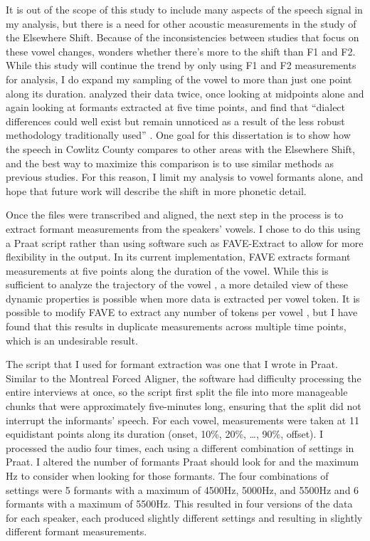 It is out of the scope of this study to include many aspects of the speech signal in my analysis, but there is a need for other acoustic measurements in the study of the Elsewhere Shift. Because of the inconsistencies between studies that focus on these vowel changes, \citet[150]{boberg_2005} wonders whether there's more to the shift than F1 and F2. While this study will continue the trend by only using F1 and F2 measurements for analysis, I do expand my sampling of the vowel to more than just one point along its duration. \citeauthor{jacewicz_etal_2006} analyzed their data twice, once looking at midpoints alone and again looking at formants extracted at five time points, and find that ``dialect differences could well exist but remain unnoticed as a result of the less robust methodology traditionally used'' \citeyearpar[300]{jacewicz_etal_2006}. One goal for this dissertation is to show how the speech in Cowlitz County compares to other areas with the Elsewhere Shift, and the best way to maximize this comparison is to use similar methods as previous studies. For this reason, I limit my analysis to vowel formants alone, and hope that future work will describe the shift in more phonetic detail.

Once the files were transcribed and aligned, the next step in the process is to extract formant measurements from the speakers’ vowels. I chose to do this using a Praat script rather than using software such as FAVE-Extract \citep{rosenfelder_etal_2014} to allow for more flexibility in the output. In its current implementation, FAVE extracts formant measurements at five points along the duration of the vowel. While this is sufficient to analyze the trajectory of the vowel \citep{renwick_stanley_2020}, a more detailed view of these dynamic properties is possible when more data is extracted per vowel token. It is possible to modify FAVE to extract any number of tokens per vowel \citep[cf.][]{warburton_2018}, but I have found that this results in duplicate measurements across multiple time points, which is an undesirable result.

The script that I used for formant extraction was one that I wrote in Praat. Similar to the Montreal Forced Aligner, the software had difficulty processing the entire interviews at once, so the script first split the file into more manageable chunks that were approximately five-minutes long, ensuring that the split did not interrupt the informants' speech. For each vowel, measurements were taken at 11 equidistant points along its duration (onset, 10\%, 20\%, \ldots, 90\%, offset). I processed the audio four times, each using a different combination of settings in Praat. I altered the number of formants Praat should look for and the maximum Hz to consider when looking for those formants. The four combinations of settings were 5 formants with a maximum of 4500Hz, 5000Hz, and 5500Hz and 6 formants with a maximum of 5500Hz. This resulted in four versions of the data for each speaker, each produced slightly different settings and resulting in slightly different formant measurements.

